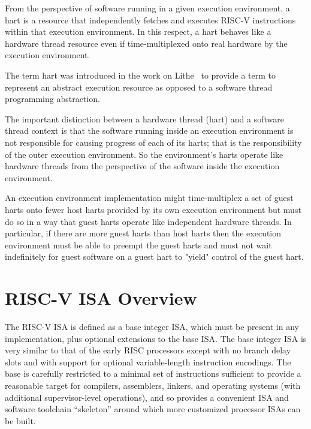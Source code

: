 From the perspective of software running in a given execution
environment, a hart is a resource that independently fetches and
executes RISC-V instructions within that execution environment.  In
this respect, a hart behaves like a hardware thread resource even if
time-multiplexed onto real hardware by the execution environment.

\begin{commentary}
The term hart was introduced in the work on
Lithe~\cite{lithe-pan-hotpar09,lithe-pan-pldi10} to provide a term to
represent an abstract execution resource as opposed to a software
thread programming abstraction.

The important distinction between a hardware thread (hart) and a
software thread context is that the software running inside an
execution environment is not responsible for causing progress of each
of its harts; that is the responsibility of the outer execution
environment.  So the environment's harts operate like hardware threads
from the perspective of the software inside the execution environment.

An execution environment implementation might time-multiplex a set of
guest harts onto fewer host harts provided by its own execution
environment but must do so in a way that guest harts operate like
independent hardware threads.  In particular, if there are more guest
harts than host harts then the execution environment must be able to
preempt the guest harts and must not wait indefinitely for guest
software on a guest hart to "yield" control of the guest hart.
\end{commentary}

\section{RISC-V ISA Overview}

The RISC-V ISA is defined as a base integer ISA, which must be present
in any implementation, plus optional extensions to the base ISA.  The
base integer ISA is very similar to that of the early RISC processors
except with no branch delay slots and with support for optional
variable-length instruction encodings.  The base is carefully
restricted to a minimal set of instructions sufficient to provide a
reasonable target for compilers, assemblers, linkers, and operating
systems (with additional supervisor-level operations), and so provides
a convenient ISA and software toolchain ``skeleton'' around which more
customized processor ISAs can be built.

